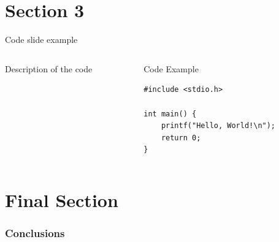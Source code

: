 \documentclass{beamer}
\begin{document}
\section{Section 3}



\begin{frame}[fragile]{Code slide example}
    \begin{columns}
        \begin{column}{0.5\textwidth}
            Description of the code
        \end{column}
        \begin{column}{0.5\textwidth}
            \begin{block}{Code Example}
                    \begin{footnotesize}
                        \begin{verbatim}
#include <stdio.h>

int main() {
    printf("Hello, World!\n");
    return 0;
}
                        \end{verbatim}
                    \end{footnotesize}
            \end{block}
        \end{column}
    \end{columns}
\end{frame}


\section{Final Section}

\begin{frame}
\frametitle{Conclusions}
\end{frame}

\backmatter
\end{document}
